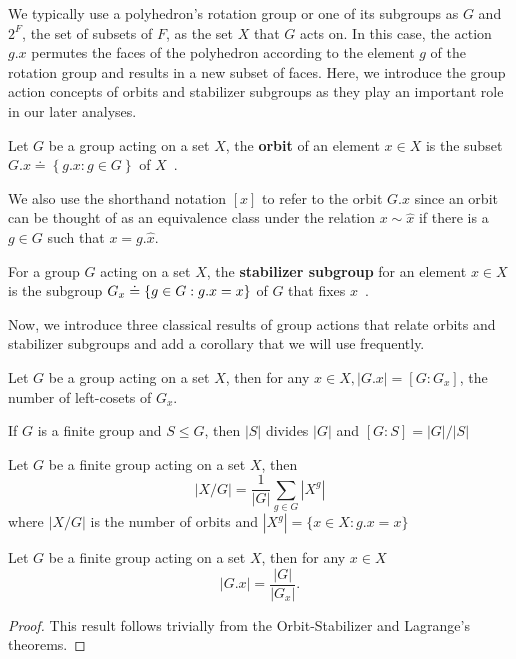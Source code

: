 We typically use a polyhedron's rotation group or one of its subgroups as $G$ and $2^F$, the set of subsets of $F$, as the set $X$ that $G$ acts on. In this case, the action $g.x$ permutes the faces of the polyhedron according to the element $g$ of the rotation group and results in a new subset of faces. Here, we introduce the group action concepts of orbits and stabilizer subgroups as they play an important role in our later analyses. 
\begin{mydef}%
Let $G$ be a group acting on a set $X$, the \textbf{orbit} of an element $x \in X$ is the subset $G.x \doteq \left\{g.x : g \in G \right\}$ of $X$~\cite{Rotman1995}.
\end{mydef}
We also use the shorthand notation $[x]$ to refer to the orbit $G.x$ since an orbit can be thought of as an equivalence class under the relation $x \sim \hat{x}$ if there is a $g \in G$ such that $x = g.\hat{x}$. 
\begin{mydef}%
For a  group $G$ acting on a set $X$, the \textbf{stabilizer subgroup} for an element $x\in X$ is the subgroup $G_x \doteq \left\{g \in {G} :g. x = x \right\}$ of $G$ that fixes $x$~\cite{Rotman1995}.
\end{mydef}
Now, we introduce three classical results of group actions that relate orbits and stabilizer subgroups and add a corollary that we will use frequently.
\begin{mythm}
Let $G$ be a group acting on a set $X$, then for any $x \in X, |G.x| = [G:G_x]$, the number of left-cosets of $G_x$.
\end{mythm}
\begin{mythm}
If $G$ is a finite group and $S \leq G$, then $|S|$ divides $|G|$ and $[G:S] = |G|/|S|$
\end{mythm}
\begin{mylem}
Let $G$ be a finite group acting on a set $X$, then $$|X/G| = \frac{1}{|G|}\sum_{g \in G}|X^g|$$ where $|X/G|$ is the number of orbits and $|X^g| = \{x \in X : g.x = x\}$ 
\end{mylem}

\begin{mycor}
\label{cor:OST}
Let $G$ be a finite group acting on a set $X$, then for any $x \in X$ $$|G.x| = \frac{|G|}{|G_x|}.$$
\end{mycor}
\begin{proof}
This result follows trivially from the Orbit-Stabilizer and Lagrange's theorems. 
\end{proof}

